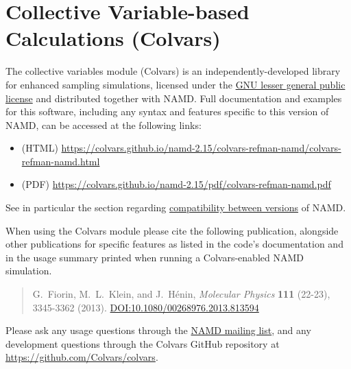 \section{Collective Variable-based Calculations (Colvars)}
\label{section:colvars}

The collective variables module (Colvars) is an independently-developed library for enhanced sampling simulations, licensed under the \href{https://www.gnu.org/licenses/lgpl-3.0.en.html}{GNU lesser general public license} and distributed together with NAMD.
Full documentation and examples for this software, including any syntax and features specific to this version of NAMD, can be accessed at the following links:
\begin{itemize}
\item (HTML) \url{https://colvars.github.io/namd-2.15/colvars-refman-namd/colvars-refman-namd.html}
\item (PDF) \url{https://colvars.github.io/namd-2.15/pdf/colvars-refman-namd.pdf}
\end{itemize}
\noindent{}See in particular the section regarding \href{https://colvars.github.io/namd-2.15/colvars-refman-namd/colvars-refman-namd.html#sec:colvars_config_changes}{compatibility between versions} of NAMD.

When using the Colvars module please cite the following publication, alongside other publications for specific features as listed in the code's documentation and in the usage summary printed when running a Colvars-enabled NAMD simulation.

\begin{quote}
  G.\ Fiorin, M.\ L.\ Klein, and J.\ H\'enin, {\it Molecular Physics} {\bf 111} (22-23), 3345-3362 (2013). \href{https://doi.org/10.1080/00268976.2013.813594}{DOI:10.1080/00268976.2013.813594}
\end{quote}

Please ask any usage questions through the \href{https://www.ks.uiuc.edu/Research/namd/mailing_list/}{NAMD mailing list}, and any development questions through the Colvars GitHub repository at \url{https://github.com/Colvars/colvars}.
